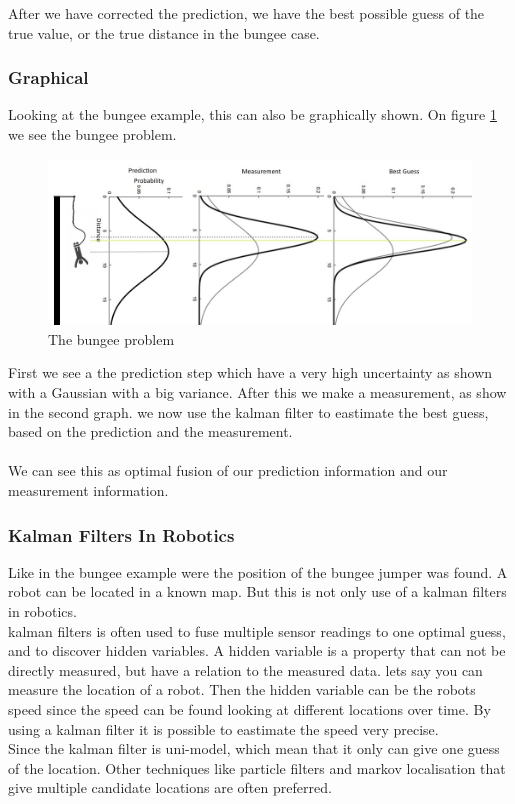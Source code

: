 After we have corrected the prediction, we have the best possible guess of the true value, or the true distance in the bungee case. 

\subsubsection{Graphical}
Looking at the bungee example, this can also be graphically shown. On figure \ref{bungeeFig} we see the bungee problem. 

\begin{figure}[H]
\includegraphics[scale=0.60]{billeder/Bungee.jpg}
\caption{The bungee problem}
\label{bungeeFig}
\end{figure}

First we see a the prediction step which have a very high uncertainty as shown with a Gaussian with a big variance. After this we make a measurement, as show in the second graph. we now use the kalman filter to eastimate the best guess, based on the prediction and the measurement. 
\\\\
We can see this as optimal fusion of our prediction information and our measurement information. 

\subsubsection{Kalman Filters In Robotics}
Like in the bungee example were the position of the bungee jumper was found. A robot can be located in a known map. But this is not only use of a kalman filters in robotics. \\
kalman filters is often used to fuse multiple sensor readings to one optimal guess, and to discover hidden variables. A hidden variable is a property that can not be directly measured, but have a relation to the measured data. lets say you can measure the location of a robot. Then the hidden variable can be the robots speed since the speed can be found looking at different locations over time. By using a kalman filter it is possible to eastimate the speed very precise. \\
Since the kalman filter is uni-model, which mean that it only can give one guess of the location. Other techniques like particle filters and markov localisation that give multiple candidate locations are often preferred. 


